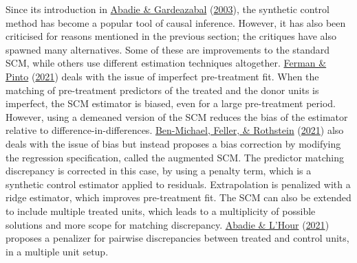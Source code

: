 \documentclass[12pt,nobind, a4paper]{reedthesis}
\begin{document}
 Since its introduction in \protect\hyperlink{ref-abadie_economic_2003}{Abadie \& Gardeazabal} (\protect\hyperlink{ref-abadie_economic_2003}{2003}), the synthetic control method has become a popular tool of causal inference. However, it has also been criticised for reasons mentioned in the previous section; the critiques have also spawned many alternatives. Some of these are improvements to the standard SCM, while others use different estimation techniques altogether. \protect\hyperlink{ref-ferman_synthetic_2021}{Ferman \& Pinto} (\protect\hyperlink{ref-ferman_synthetic_2021}{2021}) deals with the issue of imperfect pre-treatment fit. When the matching of pre-treatment predictors of the treated and the donor units is imperfect, the SCM estimator is biased, even for a large pre-treatment period. However, using a demeaned version of the SCM reduces the bias of the estimator relative to difference-in-differences. \protect\hyperlink{ref-ben-michael_augmented_2021}{Ben-Michael, Feller, \& Rothstein} (\protect\hyperlink{ref-ben-michael_augmented_2021}{2021}) also deals with the issue of bias but instead proposes a bias correction by modifying the regression specification, called the augmented SCM. The predictor matching discrepancy is corrected in this case, by using a penalty term, which is a synthetic control estimator applied to residuals. Extrapolation is penalized with a ridge estimator, which improves pre-treatment fit. The SCM can also be extended to include multiple treated units, which leads to a multiplicity of possible solutions and more scope for matching discrepancy. \protect\hyperlink{ref-abadie_penalized_2021}{Abadie \& L'Hour} (\protect\hyperlink{ref-abadie_penalized_2021}{2021}) proposes a penalizer for pairwise discrepancies between treated and control units, in a multiple unit setup.
 \linebreak
\end{document}
